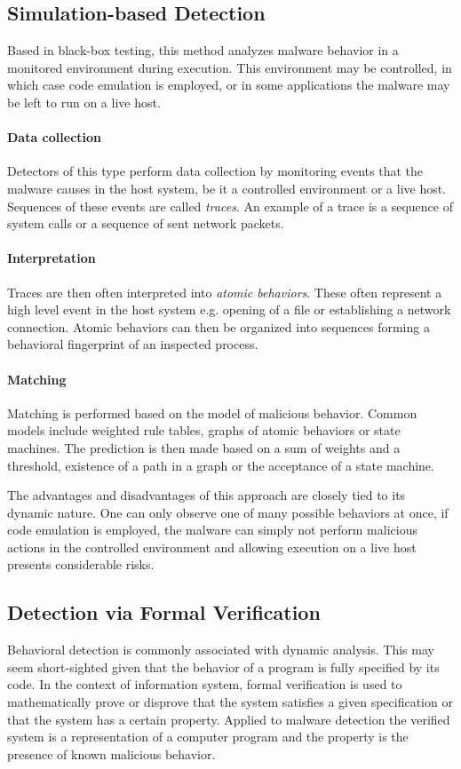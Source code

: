\subsection{Simulation-based Detection}
Based in black-box testing, this method analyzes malware behavior in a monitored environment during execution. This environment may be controlled, in which case code emulation is employed, or in some applications the malware may be left to run on a live host.

\paragraph*{Data collection} Detectors of this type perform data collection by monitoring events that the malware causes in the host system, be it a controlled environment or a live host. Sequences of these events are called \emph{traces}. An example of a trace is a sequence of system calls or a sequence of sent network packets.

\paragraph*{Interpretation} Traces are then often interpreted into \emph{atomic behaviors}. These often represent a high level event in the host system e.g. opening of a file or establishing a network connection. Atomic behaviors can then be organized into sequences forming a behavioral fingerprint of an inspected process.

\paragraph*{Matching} Matching is performed based on the model of malicious behavior. Common models include weighted rule tables, graphs of atomic behaviors or state machines. The prediction is then made based on a sum of weights and a threshold, existence of a path in a graph or the acceptance of a state machine.

The advantages and disadvantages of this approach are closely tied to its dynamic nature. One can only observe one of many possible behaviors at once, if code emulation is employed, the malware can simply not perform malicious actions in the controlled environment and allowing execution on a live host presents considerable risks.

\subsection{Detection via Formal Verification}
Behavioral detection is commonly associated with dynamic analysis. This may seem short-sighted given that the behavior of a program is fully specified by its code. In the context of information system, formal verification is used to mathematically prove or disprove that the system satisfies a given specification or that the system has a certain property. Applied to malware detection the verified system is a representation of a computer program and the property is the presence of known malicious behavior.

